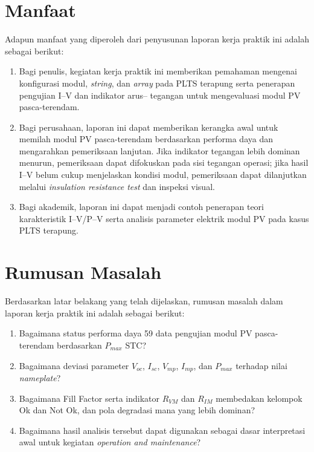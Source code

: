 \section{Manfaat}

Adapun manfaat yang diperoleh dari penyusunan laporan kerja praktik ini adalah
sebagai berikut:

\begin{enumerate}
    \item Bagi penulis, kegiatan kerja praktik ini memberikan pemahaman
          mengenai konfigurasi modul, \textit{string}, dan \textit{array} pada
          PLTS terapung serta penerapan pengujian I--V dan indikator arus--%
          tegangan untuk mengevaluasi modul PV pasca-terendam.
    \item Bagi perusahaan, laporan ini dapat memberikan kerangka awal untuk
          memilah modul PV pasca-terendam berdasarkan performa daya dan
          mengarahkan pemeriksaan lanjutan. Jika indikator tegangan lebih
          dominan menurun, pemeriksaan dapat difokuskan pada sisi tegangan
          operasi; jika hasil I--V belum cukup menjelaskan kondisi modul,
          pemeriksaan dapat dilanjutkan melalui \textit{insulation resistance
          test} dan inspeksi visual.
    \item Bagi akademik, laporan ini dapat menjadi contoh penerapan teori
          karakteristik I--V/P--V serta analisis parameter elektrik modul PV
          pada kasus PLTS terapung.
\end{enumerate}

\section{Rumusan Masalah}

Berdasarkan latar belakang yang telah dijelaskan, rumusan masalah dalam laporan
kerja praktik ini adalah sebagai berikut:

\begin{enumerate}
    \item Bagaimana status performa daya 59 data pengujian modul PV
          pasca-terendam berdasarkan $P_{max}$ STC?
    \item Bagaimana deviasi parameter $V_{oc}$, $I_{sc}$, $V_{mp}$, $I_{mp}$,
          dan $P_{max}$ terhadap nilai \textit{nameplate}?
    \item Bagaimana Fill Factor serta indikator $R_{VM}$ dan $R_{IM}$
          membedakan kelompok Ok dan Not Ok, dan pola degradasi mana yang lebih
          dominan?
    \item Bagaimana hasil analisis tersebut dapat digunakan sebagai dasar
          interpretasi awal untuk kegiatan \textit{operation and maintenance}?
\end{enumerate}

